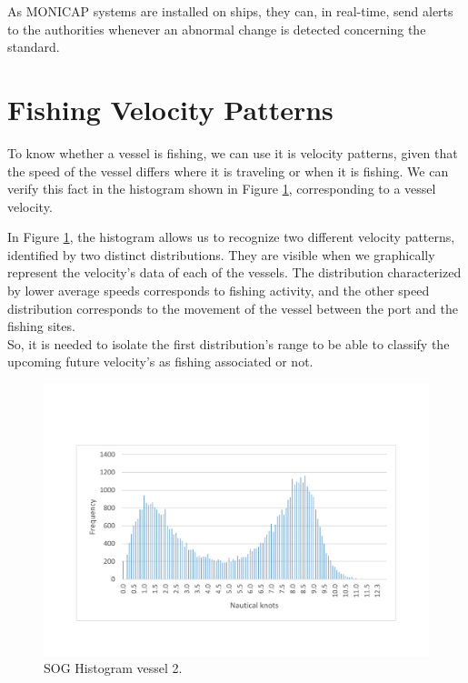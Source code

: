 As MONICAP systems are installed on ships, they can, in real-time, send alerts to the authorities whenever an abnormal change is detected concerning the standard.


\section{Fishing Velocity Patterns} %
\label{sub:fishing_velocity_patterns}

To know whether a vessel is fishing, we can use it is velocity patterns, given that the speed of the vessel differs where it is traveling or when it is fishing. We can verify this fact in the histogram shown in Figure \ref{fig:histogram_vessel2}, corresponding to a vessel velocity.

In Figure \ref{fig:histogram_vessel2}, the histogram allows us to recognize two different velocity patterns, identified by two distinct distributions. They are visible when we graphically represent the velocity's data of each of the vessels. The distribution characterized by lower average speeds corresponds to fishing activity, and the other speed distribution corresponds to the movement of the vessel between the port and the fishing sites.\\
So, it is needed to isolate the first distribution's range to be able to classify the upcoming future velocity's as fishing associated or not.
\begin{figure}[H]
\centering
\includegraphics[trim=0 50 0 50, width=0.8\linewidth]{Chapters/img/hist_vessel2.pdf}
\caption{SOG Histogram vessel 2.}
\label{fig:histogram_vessel2}
\end{figure}



